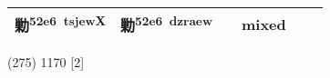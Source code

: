 \documentclass[14pt,a4paper]{scrartcl}
\begin{document}
\begin{longtable}[c]{@{}llllll@{}}
\begin{minipage}[t]{0.14\columnwidth}\raggedright\strut
勦\textsuperscript{52e6~tsjewX}
\strut\end{minipage} &
\begin{minipage}[t]{0.14\columnwidth}\raggedright\strut
勦\textsuperscript{52e6~dzraew}
\strut\end{minipage} &
\begin{minipage}[t]{0.14\columnwidth}\raggedright\strut
\strut\end{minipage} &
\begin{minipage}[t]{0.14\columnwidth}\raggedright\strut
mixed
\strut\end{minipage}\tabularnewline
\bottomrule
\end{longtable}

(275) 1170 {[}2{]}
\end{document}
